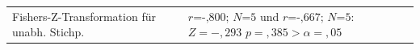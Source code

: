 \documentclass[a4paper,11pt]{article}%
\renewcommand{\\}{\vspace*{0.5\baselineskip} \newline}
\begin{document}
{{{{{{{{{{{\begin{table}[H]
\begin{tabularx}{\textwidth}{| p{3.7cm} | p{5cm} | p{5cm} |}
		\hline 		

		Fishers-Z-Transformation für unabh. Stichp.
		&
		& $\textit{r=-,800; N=5}$ und $\textit{r=-,667; N=5} :$\newline \newline
		$Z=-,293$\newline
		$p=,385>\alpha=,05$ \\
		
		\hline 	
	\end{tabularx}
\end{table}		


%



%
%
%
%
%
%	





}}}}}}}}}}}
\end{document}
